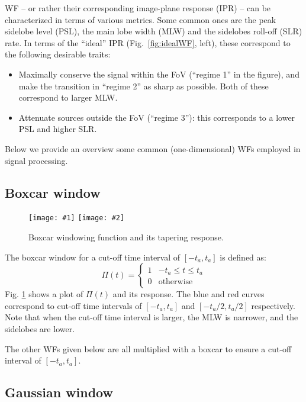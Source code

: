 \documentclass[useAMS,usenatbib]{mn2e}
\begin{document}
WF -- or rather their corresponding image-plane response (IPR) -- can be characterized in terms of various metrics. Some common 
ones are the peak sidelobe level (PSL), the main lobe width (MLW) and the sidelobes roll-off (SLR) rate. In terms of the ``ideal'' 
IPR (Fig.~\ref{fig:idealWF}, left), these correspond to the following desirable traits:

\begin{itemize}
\item Maximally conserve the signal within the FoV (``regime 1'' in the figure), and make the transition in ``regime 2'' as sharp as possible. Both of these correspond to larger MLW.
\item Attenuate sources outside the FoV (``regime 3''): this corresponds to a lower PSL and higher SLR.
\end{itemize}

Below we provide an overview some common (one-dimensional) WFs employed in signal processing.

\newcommand{\FilterFigure}[4]{
\begin{figure}
\texttt{[image: \#1]}%
\texttt{[image: \#2]}
\caption{#3}\label{#4}
\end{figure}
}

\subsection{Boxcar window}

\FilterFigure{Figures/boxcargrey.png}{Figures/freq_resp_boxgrey.png}{Boxcar windowing 
function and its tapering response.}{fig:wf:box}

The boxcar window for a cut-off time interval of $[-t_a,t_a]$ is defined as:
\begin{equation}
\Pi(t)=\left\{
\begin{array}{rl}
1 & \mbox{$-t_a \leq t \leq t_a$} \\
0 & \mbox{otherwise}
\end{array}\right.
\end{equation}
Fig. \ref{fig:wf:box} shows a plot of $\Pi(t)$ and its response. The blue and red curves 
correspond to cut-off time intervals of $[-t_a, t_a]$ and 
$[-t_a/2,t_a/2]$ respectively. Note that when the cut-off time interval is larger, the MLW is 
narrower, and the sidelobes are lower.

The other WFs given below are all multiplied with a boxcar to ensure a cut-off interval of $[-t_a,t_a]$.

\subsection{Gaussian window}
\end{document}
